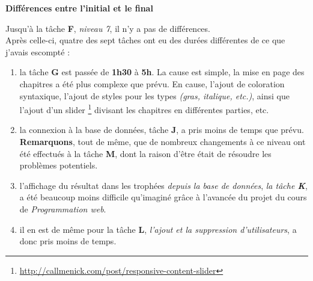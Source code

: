 {\Large \textbf{Différences entre l'initial et le final}}

Jusqu'à la tâche \textbf{F}, \textit{niveau 7}, il n'y a pas de différences. \\
Après celle-ci, quatre des sept tâches ont eu des durées différentes de ce que j'avais escompté :

\begin{enumerate}

    \item la tâche \textbf{G} est passée de \textbf{1h30} à \textbf{5h}. La cause est simple, la mise en page des chapitres a été plus complexe que prévu.
    En cause, l'ajout de coloration syntaxique, l'ajout de styles pour les types \textit{(gras, italique, etc.)}, ainsi que l'ajout d'un slider \footnote{\url{http://callmenick.com/post/responsive-content-slider}} divisant les chapitres en différentes parties, etc.
    
    \item la connexion à la base de données, tâche \textbf{J}, a pris moins de temps que prévu. \\
    \textbf{Remarquons}, tout de même, que de nombreux changements à ce niveau ont été effectués à la tâche \textbf{M}, dont la raison d'être était de résoudre les problèmes potentiels.
    
    \item l'affichage du résultat dans les trophées \textit{depuis la base de données}, \textit{la tâche \textbf{K}}, a été beaucoup moins difficile qu'imaginé grâce à l'avancée du projet du cours de \textit{Programmation web}.
    
    \item il en est de même pour la tâche \textbf{L}, \textit{l'ajout et la suppression d'utilisateurs}, a donc pris moins de temps.

\end{enumerate}

